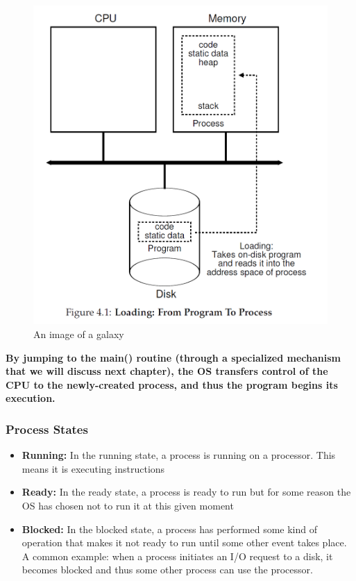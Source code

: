 \documentclass{article}
\begin{document}
\begin{figure}[H]
    \centering
    \includegraphics[width=13cm]{fig4.1.png}
    \caption{An image of a galaxy}
    \label{fig:galaxy}
\end{figure}

\textbf{\color{red}By jumping to the main() routine (through a specialized mechanism that we will discuss next chapter), the OS transfers control of the CPU to the newly-created process, and thus the program begins its execution.}

\subsubsection{Process States}
\begin{itemize}
    \item \textbf{Running: }In the running state, a process is running on a processor. This means it is executing instructions
    
    \item \textbf{Ready: }In the ready state, a process is ready to run but for some reason the OS has chosen not to run it at this given moment
    
    \item \textbf{Blocked: }In the blocked state, a process has performed some kind of operation that makes it not ready to run until some other event takes place. A common example: when a process initiates an I/O request to a disk, it becomes blocked and thus some other process can use the processor.
\end{itemize}
\end{document}
